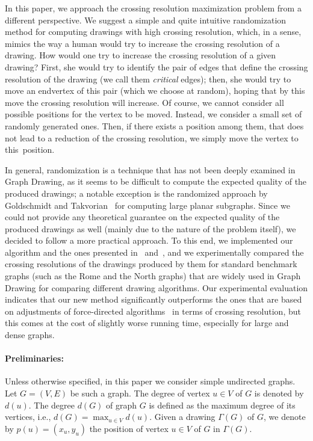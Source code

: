 \documentclass[runningheads]{llncs}
\begin{document}
In this paper, we approach the crossing resolution maximization problem from a different perspective. We suggest a simple and quite intuitive randomization method for computing drawings with high crossing resolution, which, in a sense, mimics the way a human would try to increase the crossing resolution of a drawing. How would one try to increase the crossing resolution of a given drawing? First, she would try to identify the pair of edges that define the crossing resolution of the drawing (we call them \emph{critical} edges); then, she would try to move an endvertex of this pair (which we choose at random), hoping that by this move the crossing resolution will increase. Of course, we cannot consider all possible positions for the vertex to be moved. Instead, we consider a small set of randomly generated ones. Then, if there exists a position among them, that does not lead to a reduction of the crossing resolution, we simply move the vertex to this~position.

In general, randomization is a technique that has not been deeply examined in Graph Drawing, as it seems to be difficult to compute the expected quality of the produced drawings; a notable exception is the randomized approach by Goldschmidt and Takvorian~\cite{DBLP:journals/networks/GoldschmidtT94} for computing large planar subgraphs. Since we could not provide any theoretical guarantee on the expected quality of the produced drawings as well (mainly due to the nature of the problem itself), we decided to follow a more practical approach. To this end, we implemented our algorithm and the ones presented in~\cite{DBLP:journals/vlc/HuangEHL13} and~\cite{DBLP:journals/cj/ArgyriouBS13}, and we experimentally compared the crossing resolutions of the drawings produced by them for standard benchmark graphs (such as the Rome and the North graphs) that are widely used in Graph Drawing for comparing different drawing algorithms. Our experimental evaluation indicates that our new method significantly outperforms the ones that are based on adjustments of force-directed algorithms~\cite{DBLP:journals/vlc/HuangEHL13,DBLP:journals/cj/ArgyriouBS13} in terms of crossing resolution, but this comes at the cost of slightly worse running time, especially for large and dense graphs. 

\paragraph{Preliminaries:}
Unless otherwise specified, in this paper we consider simple undirected graphs. Let $G=(V,E)$ be such a graph. The degree of vertex $u\in V$ of $G$ is denoted by $d(u)$. The degree $d(G)$ of  graph $G$ is defined as the maximum degree of its vertices, i.e., $d(G)=\max_{u\in V}d(u)$.
%
Given a drawing $\Gamma(G)$ of $G$, we denote by $p(u)=(x_u,y_u)$ the position of vertex $u \in V$ of $G$ in $\Gamma(G)$. %
\end{document}
